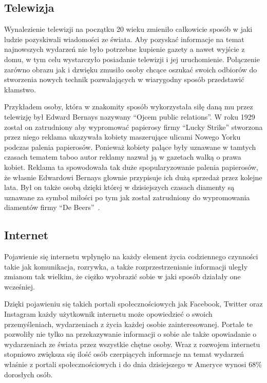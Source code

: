 \subsection{Telewizja}
Wynalezienie telewizji na początku 20 wieku zmieniło całkowicie sposób w jaki ludzie pozyskiwali wiadomości ze świata.
Aby pozyskać informacje na temat najnowszych wydarzeń nie było potrzebne kupienie gazety a nawet 
wyjście z domu, w tym celu wystarczyło posiadanie telewizji i jej uruchomienie. Połączenie zarówno obrazu
jak i dzwięku zmusiło osoby chcące oszukać swoich odbiorów do stworzenia nowych technik 
pozwalających w wiarygodny sposób przedstawić kłamstwo.

Przykładem osoby, która w znakomity sposób wykorzystała siłę daną mu przez telewizję był Edward Bernays
nazywany ``Ojcem public relations''.
W roku 1929 został on zatrudniony aby wypromować papierosy firmy ``Lucky Strike''
stworzona przez niego reklama ukazywała kobiety maszerujące ulicami Nowego Yorku
podczas palenia papierosów. Ponieważ kobiety palące były uznawane w tamtych czasach tematem
taboo autor reklamy nazwał ją w gazetach walką o prawa kobiet. Reklama ta spowodowała tak duże 
spopularyzowanie palenia papierosów, że własnie Edwardowi Bernays głownie przypisuje
ich dużą sprzedaż przez kolejne lata.
Był on także osobą dzięki której w dzisiejszych czasach diamenty są uznawane za symbol miłości po tym jak
został zatrudniony do wypromowania diamentów firmy ``De Beers''~\cite{MarkDice}.

\subsection{Internet}
Pojawienie się internetu wpłynęło na każdy element życia codziennego czynności takie jak komunikacja, rozrywka,
a także rozprzestrzenianie informacji uległy zmianom tak wielkim, że ciężko wyobrazić sobie w jaki sposób działały
one wcześniej. 

Dzięki pojawieniu się takich portali społecznościowych jak Facebook, Twitter oraz Instagram każdy użytkownik
internetu może opowiedzieć o swoich przemyśleniach, wydarzeniach z życia każdej osobie zainteresowanej. Portale te
pozwoliły nie tylko na przekazywanie informacji o sobie ale także opowiadanie o wydarzeniach ze świata przez wszystkie
chętne osoby. Wraz z rozwojem internetu stopniowo zwiększa się ilość osób czerpiących informacje na temat wydarzeń
właśnie z portali społecznościowych i do dnia dzisiejszego w Ameryce wynosi 68\% dorosłych osób. 

